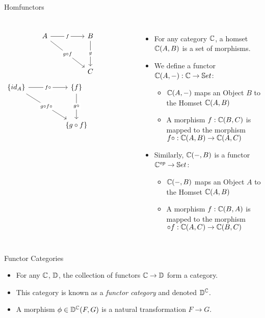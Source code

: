 \begin{frame}[fragile]{Homfunctors}
	\begin{columns}
		\[\begin{tikzcd}
			A && B \\
			\\
			&& C
			\arrow["f"{description}, from=1-1, to=1-3]
			\arrow["{g \circ f}"{description}, from=1-1, to=3-3]
			\arrow["g"{description}, from=1-3, to=3-3]
		\end{tikzcd}\]
		\[\begin{tikzcd}
			{\{id_A\}} && {\{f\}} && {} \\
			\\
			&& {\{g \circ f\}}
			\arrow["{f \circ}"{description}, from=1-1, to=1-3]
			\arrow["{g \circ f \circ}"{description}, from=1-1, to=3-3]
			\arrow["{g \circ}"{description}, from=1-3, to=3-3]
		\end{tikzcd}\]
		\begin{itemize}
			\item For any category $\mathbb{C}$, a homset $\mathbb{C}(A,B)$ is a set of morphisms.
			\pause\item We define a functor $\mathbb{C}(A, -) : \mathbb{C} \to \mathbb{S}et$:
			\begin{itemize}
				\pause\item $\mathbb{C}(A, -)$ maps an Object $B$ to the Homset $\mathbb{C}(A,B)$
				\pause\item A morphism $f : \mathbb{C}(B,C)$ is mapped to the morphism $f \circ : \mathbb{C}(A,B) \to \mathbb{C}(A,C)$
			\end{itemize}
			\pause\item Similarly, $\mathbb{C}(-, B)$ is a functor $\mathbb{C}^{op} \to \mathbb{S}et$:
			\begin{itemize}
				\pause\item $\mathbb{C}(-, B)$ maps an Object $A$ to the Homset $\mathbb{C}(A,B)$
				\pause\item A morphism $f : \mathbb{C}(B,A)$ is mapped to the morphism $\circ f: \mathbb{C}(A,C) \to \mathbb{C}(B,C)$
			\end{itemize}
		\end{itemize}
	\end{columns}
\end{frame}

\begin{frame}{Functor Categories}
 \begin{itemize}
  \item For any $\mathbb{C}$, $\mathbb{D}$, the collection of functors $\mathbb{C} \to \mathbb{D}$ form a category.
  \pause\item This category is known as a \textit{functor category} and denoted $\mathbb{D}^{\mathbb{C}}$.
  \pause\item A morphism $\phi \in \mathbb{D}^{\mathbb{C}}(F, G)$ is a natural transformation $F \to G$.
 \end{itemize}
\end{frame}
